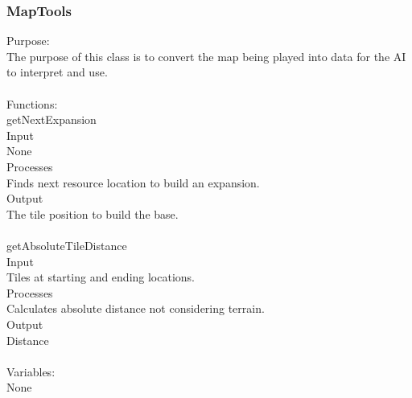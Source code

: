 \documentclass[10pt,letterpaper,onecolumn,draftclsnofoot]{IEEEtran}
\begin{document}
\subsubsection{MapTools}
Purpose:\\
The purpose of this class is to convert the map being played into data for the AI to interpret and use.\\
\\
Functions:\\
getNextExpansion\\
Input\\
None\\
Processes\\
Finds next resource location to build an expansion.\\
Output\\
The tile position to build the base.\\
\\
getAbsoluteTileDistance\\
Input\\
Tiles at starting and ending locations.\\
Processes\\
Calculates absolute distance not considering terrain.\\
Output\\
Distance\\
\\
Variables:\\
None\\
\end{document}
